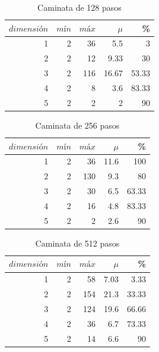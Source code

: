 \documentclass[12pt]{amsart}
\begin{document}
{\begin{table}[ht]
    \caption{Caminata de 128 pasos}
    \label{datos}
    \centering
    \begin{tabular}{|r|rrr|r|}
       \hline
        $dimensión$&$mín$&$máx$&$\mu$&\% \\
        \hline
        1 & 2 & 36 & 5.5 & 3 \\
        2 & 2 & 12 & 9.33 & 30 \\
        3 & 2 & 116 & 16.67 & 53.33 \\
        4 & 2 & 8 & 3.6 & 83.33 \\
        5 & 2 & 2 & 2 & 90\\
        \hline
    \end{tabular}
\end{table}
\bigskip

\begin{table}[ht]
    \caption{Caminata de 256 pasos}
    \label{datos}
    \centering
    \begin{tabular}{|r|rrr|r|}
       \hline
        $dimensión$&$mín$&$máx$&$\mu$&\% \\
        \hline
        1 & 2 & 36 & 11.6 & 100 \\
        2 & 2 & 130 & 9.3 & 80 \\
        3 & 2 & 30 & 6.5 & 63.33 \\
        4 & 2 & 16 & 4.8 & 83.33 \\
        5 & 2 & 2 & 2.6 & 90\\
        \hline
    \end{tabular}
\end{table}
\bigskip

\begin{table}[ht]
    \caption{Caminata de 512 pasos}
    \label{datos}
    \centering
    \begin{tabular}{|r|rrr|r|}
       \hline
        $dimensión$&$mín$&$máx$&$\mu$&\% \\
        \hline
        1 & 2 & 58 & 7.03 & 3.33 \\
        2 & 2 & 154 & 21.3 & 33.33 \\
        3 & 2 & 124 & 19.6 & 66.66 \\
        4 & 2 & 36 & 6.7 & 73.33 \\
        5 & 2 & 14 & 6.6 & 90\\
        \hline
    \end{tabular}
\end{table}
}
\clearpage
\\
\\
\end{document}
